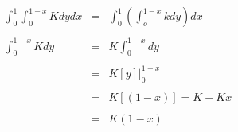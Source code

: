 \documentclass[12pt]{article}
\begin{document}
    \begin{equation*}
        \begin{array}{rcl}
            \displaystyle \int_{0}^{1}\int_{0}^{1-x}K dy dx & = & \displaystyle\int_{0}^{1}\left(\int_{o}^{1-x}k dy\right)dx
            \\
            \\
            \displaystyle \int_{0}^{1-x}K dy & = & K\int_{0}^{1-x}dy
            \\
            \\
            & = & K[y]\vert_{0}^{1-x}
            \\
            \\
            & = & K[(1-x)] = K - Kx
            \\
            \\
            & = & K(1-x)
        \end{array}
    \end{equation*}
\end{document}
